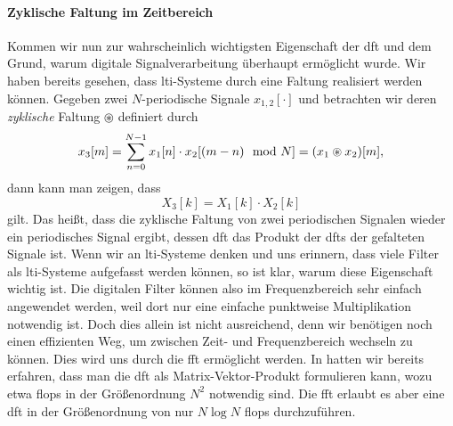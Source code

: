 \paragraph{Zyklische Faltung im Zeitbereich}\label{par:fourier:cycl_conv}
%
Kommen wir nun zur wahrscheinlich wichtigsten Eigenschaft der \gls{dft} und dem Grund, warum digitale Signalverarbeitung überhaupt ermöglicht wurde.
Wir haben bereits gesehen, dass \gls{lti}-Systeme durch eine Faltung realisiert werden können.
Gegeben zwei $N$-periodische Signale $x_{1,2}[\cdot]$ und betrachten wir deren \emph{zyklische} Faltung $\circledast$ definiert durch
\begin{equation}\label{eq:fourier:cyclic_conv}
x_3[m] = {\sum\limits_{n=0}^{N-1}{x_1[n] \cdot x_2[(m-n) \mod N]}} = (x_1 \circledast x_2)[m],
\end{equation}
dann kann man zeigen, dass
\[
X_3[k] = X_1[k] \cdot X_2[k]
\]
gilt.
Das heißt, dass die zyklische Faltung von zwei periodischen Signalen wieder ein periodisches Signal ergibt, dessen \gls{dft} das Produkt der \glspl{dft} der gefalteten Signale ist.
Wenn wir an \gls{lti}-Systeme denken und uns erinnern, dass viele Filter als \gls{lti}-Systeme aufgefasst werden können, so ist klar, warum diese Eigenschaft wichtig ist.
Die digitalen Filter können also im Frequenzbereich sehr einfach angewendet werden, weil dort nur eine einfache punktweise Multiplikation notwendig ist.
Doch dies allein ist nicht ausreichend, denn wir benötigen noch einen effizienten Weg, um zwischen Zeit- und Frequenzbereich wechseln zu können.
Dies wird uns durch die \gls{fft} ermöglicht werden.
In  hatten wir bereits erfahren, dass man die \gls{dft} als Matrix-Vektor-Produkt formulieren kann, wozu etwa \glspl{flop} in der Größenordnung $N^2$ notwendig sind.
Die \gls{fft} erlaubt es aber eine \gls{dft}  in der Größenordnung von nur $N \log{N}$ \glspl{flop} durchzuführen.

